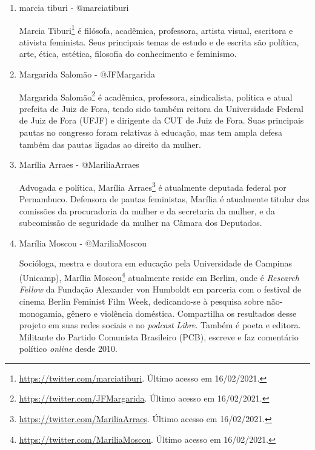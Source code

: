 \documentclass[
	12pt,				%
	openright,			%
	twoside,			%
	a4paper,			%
	english,			%
	brazil				%
	]{abntex2}
\begin{document}
\begin{anexosenv}
\begin{enumerate}
 Jornalista, escritora e especialista em comunicação digital, Manuela Barem\footnote{\url{https://twitter.com/manubarem}. Último acesso em 18/02/2021.} é também fundadora e ex-editora chefe do BuzzFeed-Brasil, mídia onde abordava temas como causas LGBT, feminismo, racismo e saúde mental.

 \item marcia tiburi - @marciatiburi
 
 Marcia Tiburi\footnote{\url{https://twitter.com/marciatiburi}. Último acesso em 16/02/2021.} é filósofa, acadêmica, professora, artista visual, escritora e ativista feminista. Seus principais temas de estudo e de escrita são política, arte, ética, estética, filosofia do conhecimento e feminismo.

 \item Margarida Salomão - @JFMargarida
 
 Margarida Salomão\footnote{\url{https://twitter.com/JFMargarida}. Último acesso em 16/02/2021.} é acadêmica, professora, sindicalista, política e atual prefeita de Juiz de Fora, tendo sido também reitora da Universidade Federal de Juiz de Fora (UFJF) e dirigente da CUT de Juiz de Fora. Suas principais pautas no congresso foram relativas à educação, mas tem ampla defesa também das pautas ligadas ao direito da mulher.

 \item Marília Arraes - @MariliaArraes
 
 Advogada e política, Marília Arraes\footnote{\url{https://twitter.com/MariliaArraes}. Último acesso em 16/02/2021.} é atualmente deputada federal por Pernambuco. Defensora de pautas feministas, Marília é atualmente titular das comissões da procuradoria da mulher e da secretaria da mulher, e da subcomissão de seguridade da mulher na Câmara dos Deputados.

 \item Marília Moscou - @MariliaMoscou
 
 Socióloga, mestra e doutora em educação pela Universidade de Campinas (Unicamp), Marília Moscou\footnote{\url{https://twitter.com/MariliaMoscou}. Último acesso em 16/02/2021.} atualmente reside em Berlim, onde é \textit{Research Fellow} da Fundação Alexander von Humboldt em parceria com o festival de cinema Berlin Feminist Film Week, dedicando-se à pesquisa sobre não-monogamia, gênero e violência doméstica. Compartilha os resultados desse projeto em suas redes sociais e no \textit{podcast} \textit{Libre}. Também é poeta e editora. Militante do Partido Comunista Brasileiro (PCB), escreve e faz comentário político \textit{online} desde 2010.


\end{enumerate}
\end{anexosenv}
\end{document}
